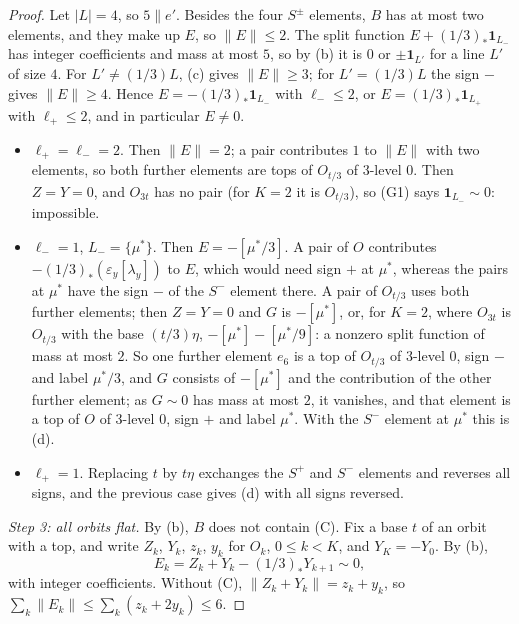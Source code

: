 \begin{proof}
Let $|L|=4$, so $5\parallel e'$. Besides the four $S^{\pm}$ elements, $B$ has
at most two elements, and they make up $E$, so $\|E\|\le2$. The split
function $E+(1/3)_{*}\mathbf 1_{L_{-}}$ has integer coefficients and mass at
most $5$, so by (b) it is $0$ or $\pm\mathbf 1_{L'}$
for a line $L'$ of size $4$. For $L'\ne(1/3)L$, (c)
gives $\|E\|\ge3$; for $L'=(1/3)L$ the sign $-$ gives $\|E\|\ge4$. Hence
$E=-(1/3)_{*}\mathbf 1_{L_{-}}$ with $\ell_{-}\le2$, or $E=(1/3)_{*}\mathbf
1_{L_{+}}$ with $\ell_{+}\le2$, and in particular $E\ne0$.
\begin{itemize}
\item $\ell_{+}=\ell_{-}=2$. Then $\|E\|=2$; a pair contributes $1$ to $\|E\|$
with two elements, so both further elements are tops of $O_{t/3}$ of
$3$-level $0$. Then $Z=Y=0$, and $O_{3t}$ has no pair (for $K=2$ it is
$O_{t/3}$), so (G1) says $\mathbf 1_{L_{-}}\sim0$: impossible.
\item $\ell_{-}=1$, $L_{-}=\{\mu^{*}\}$. Then $E=-[\mu^{*}/3]$. A pair of $O$
contributes $-(1/3)_{*}(\varepsilon_{y}[\lambda_{y}])$ to $E$, which would
need sign $+$ at $\mu^{*}$, whereas the pairs at $\mu^{*}$ have the sign $-$
of the $S^{-}$ element there. A pair of $O_{t/3}$ uses both further
elements; then $Z=Y=0$ and $G$ is $-[\mu^{*}]$, or, for $K=2$, where
$O_{3t}$ is $O_{t/3}$ with the base $(t/3)\eta$, $-[\mu^{*}]-[\mu^{*}/9]$: a
nonzero split function of mass at most $2$. So one further element $e_{6}$ is
a top of $O_{t/3}$ of $3$-level $0$, sign $-$ and label $\mu^{*}/3$, and $G$
consists of $-[\mu^{*}]$ and the contribution of the other further element;
as $G\sim0$ has mass at most $2$, it vanishes, and that element is a top of
$O$ of $3$-level $0$, sign $+$ and label $\mu^{*}$. With the $S^{-}$ element
at $\mu^{*}$ this is (d).
\item $\ell_{+}=1$. Replacing $t$ by $t\eta$ exchanges the $S^{+}$ and
$S^{-}$ elements and reverses all signs, and the previous case gives
(d) with all signs reversed.
\end{itemize}

\emph{Step 3: all orbits flat.} By (b), $B$ does not
contain (C). Fix a base $t$ of an orbit with a top, and write $Z_{k}$,
$Y_{k}$, $z_{k}$, $y_{k}$ for $O_{k}$, $0\le k<K$, and $Y_{K}=-Y_{0}$. By
(b),
\[
  E_{k}=Z_{k}+Y_{k}-(1/3)_{*}Y_{k+1}\sim0,
\]
with integer coefficients. Without (C), $\|Z_{k}+Y_{k}\|=z_{k}+y_{k}$, so
$\sum_{k}\|E_{k}\|\le\sum_{k}(z_{k}+2y_{k})\le6$.


\end{proof}
